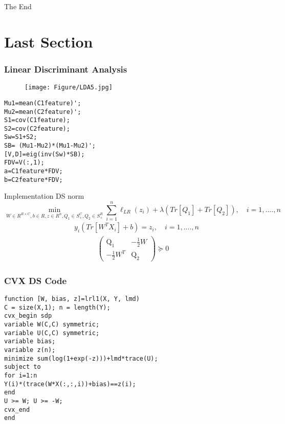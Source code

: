 \documentclass[11pt]{beamer}
\begin{document}

\begin{frame}
\Huge{\centerline{The End}}
\end{frame}
\section{Last Section}

\begin{frame}[fragile] %
\frametitle{Linear Discriminant Analysis}
\begin{figure}
    \texttt{[image: Figure/LDA5.jpg]}
  \end{figure}
\begin{verbatim}
Mu1=mean(C1feature)';
Mu2=mean(C2feature)';
S1=cov(C1feature);
S2=cov(C2feature);
Sw=S1+S2;
SB= (Mu1-Mu2)*(Mu1-Mu2)';
[V,D]=eig(inv(Sw)*SB);
FDV=V(:,1); 
a=C1feature*FDV;
b=C2feature*FDV;
\end{verbatim}
\end{frame}
\begin{frame}{Implementation DS norm}
\begin{equation}
\min_{W\in R^{R\times C},b\in R, z\in R^n, Q_1\in S_+^C,Q_2\in S_+^R} \sum_{i=1}^n \ell_{LR}\left(z_i\right)+\lambda \left(Tr[Q_1]+Tr[Q_2]\right), \quad i=1,....,n
\end{equation}
\begin{eqnarray*}
 \quad   y_i\left(Tr[W^T X_i]+b\right)=z_i, \quad
 i=1,....,n
\end{eqnarray*}
\begin{eqnarray*}
\left(\begin{array}{cc} \mathrm{Q_1} & -\frac{1}{2}W\\ -\frac{\mathrm{1}}{2}W^T & \mathrm{Q_2} \end{array}\right) \succeq 0
\end{eqnarray*} 
\end{frame}
\begin{frame}[fragile] %
\frametitle{CVX DS Code}
\begin{verbatim}
function [W, bias, z]=lrl1(X, Y, lmd)
C = size(X,1); n = length(Y);
cvx_begin sdp
variable W(C,C) symmetric;
variable U(C,C) symmetric;
variable bias;
variable z(n);
minimize sum(log(1+exp(-z)))+lmd*trace(U);
subject to
for i=1:n
Y(i)*(trace(W*X(:,:,i))+bias)==z(i);
end
U >= W; U >= -W;
cvx_end
end
\end{verbatim}
\end{frame}
\end{document}

